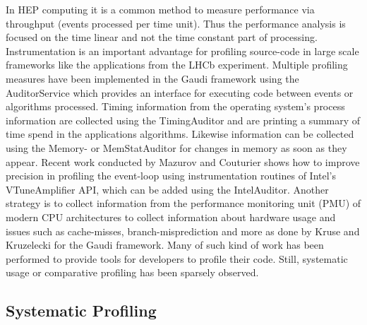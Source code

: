 \documentclass[a4paper]{jpconf}
\begin{document}
In HEP computing it is a common method to measure performance via throughput (events processed per time unit). Thus the performance analysis is focused on the time linear and not the time constant part of processing. Instrumentation is an important advantage for profiling source-code in large scale frameworks like the applications from the LHCb experiment. Multiple profiling measures have been implemented in the Gaudi framework using the AuditorService \cite{status_gaudi} which provides an interface for executing code between events or algorithms processed.
\newline
Timing information from the operating system's process information are collected using the TimingAuditor and are printing a summary of time spend in the applications algorithms. Likewise information can be collected using the Memory- or MemStatAuditor for changes in memory as soon as they appear. Recent work \cite{intel_auditor} conducted by Mazurov and Couturier shows how to improve precision in profiling the event-loop using instrumentation routines of Intel's VTune\texttrademark Amplifier API, which can be added using the IntelAuditor. Another strategy is to collect information from the performance monitoring unit (PMU) of modern CPU architectures to collect information about hardware usage and issues such as cache-misses, branch-misprediction and more as done by Kruse and Kruzelecki \cite{modular_monitoring} for the Gaudi framework. Many of such kind of work has been performed to provide tools for developers to profile their code. Still, systematic usage or comparative profiling has been sparsely observed.

\subsection{Systematic Profiling}
\label{sec:integrated_profiling}
\end{document}
